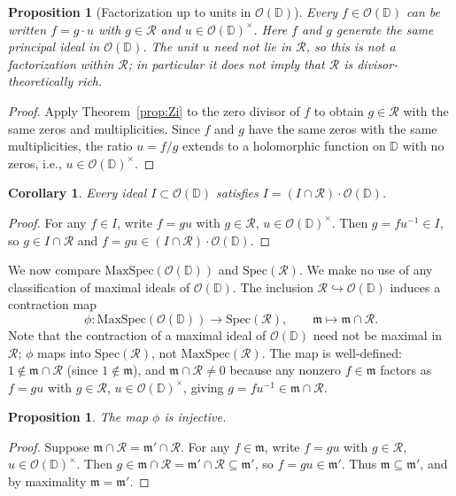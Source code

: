 \documentclass{amsart}
\newtheorem{corollary}[theorem]{Corollary}
\newtheorem{proposition}[theorem]{Proposition}
\theoremstyle{definition}
\newcommand{\D}{\mathbb{D}}
\newcommand{\OD}{\mathcal{O}(\D)}
\newcommand{\mR}{\mathcal{R}}
\begin{document}
\begin{proposition}[Factorization up to units in $\OD$]
\label{prop:associate}
Every $f \in \OD$ can be written $f = g \cdot u$ with $g \in \mR$ and
$u \in \OD^\times$.  Here $f$ and $g$ generate the same principal ideal
in $\OD$.  The unit $u$ need not lie in $\mR$, so this is not a
factorization within $\mR$; in particular it does not imply that $\mR$
is divisor-theoretically rich.
\end{proposition}

\begin{proof}
Apply Theorem~\ref{prop:Zi} to the zero divisor of $f$ to obtain
$g \in \mR$ with the same zeros and multiplicities.  Since $f$ and $g$
have the same zeros with the same multiplicities, the ratio $u = f/g$
extends to a holomorphic function on $\D$ with no zeros, i.e.,
$u \in \OD^\times$.
\end{proof}

\begin{corollary}
\label{cor:ideals}
Every ideal $I \subset \OD$ satisfies $I = (I \cap \mR)\cdot\OD$.
\end{corollary}

\begin{proof}
For any $f \in I$, write $f = gu$ with $g \in \mR$, $u \in \OD^\times$.
Then $g = fu^{-1} \in I$, so $g \in I \cap \mR$ and
$f = gu \in (I \cap \mR)\cdot\OD$.
\end{proof}

We now compare $\mathrm{MaxSpec}(\OD)$ and $\mathrm{Spec}(\mR)$.  We
make no use of any classification of maximal ideals of $\OD$.  The
inclusion $\mR \hookrightarrow \OD$ induces a contraction map
\[
  \phi \colon \mathrm{MaxSpec}(\OD) \to \mathrm{Spec}(\mR),
  \qquad \mathfrak{m} \mapsto \mathfrak{m} \cap \mR.
\]
Note that the contraction of a maximal ideal of $\OD$ need not be
maximal in $\mR$; $\phi$ maps into $\mathrm{Spec}(\mR)$, not
$\mathrm{MaxSpec}(\mR)$.  The map is well-defined: $1 \notin \mathfrak{m}
\cap \mR$ (since $1 \notin \mathfrak{m}$), and $\mathfrak{m} \cap \mR
\neq 0$ because any nonzero $f \in \mathfrak{m}$ factors as $f = gu$
with $g \in \mR$, $u \in \OD^\times$, giving $g = fu^{-1} \in
\mathfrak{m} \cap \mR$.

\begin{proposition}
\label{prop:inject}
The map $\phi$ is injective.
\end{proposition}

\begin{proof}
Suppose $\mathfrak{m} \cap \mR = \mathfrak{m}' \cap \mR$.  For any
$f \in \mathfrak{m}$, write $f = gu$ with $g \in \mR$,
$u \in \OD^\times$.  Then $g \in \mathfrak{m} \cap \mR =
\mathfrak{m}' \cap \mR \subseteq \mathfrak{m}'$, so $f = gu \in
\mathfrak{m}'$.  Thus $\mathfrak{m} \subseteq \mathfrak{m}'$, and by
maximality $\mathfrak{m} = \mathfrak{m}'$.
\end{proof}
\end{document}
